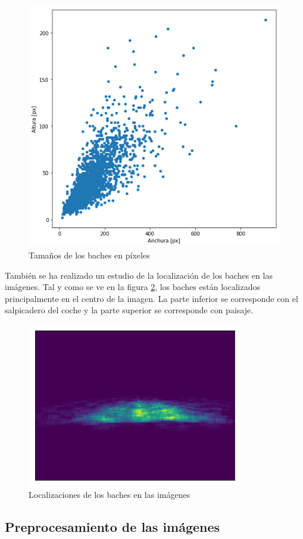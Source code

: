 \begin{figure}[H]
	\centering
	\includegraphics[width=0.7\linewidth]{images/pothole_sizes_scatter_plot.png}
	\caption{Tamaños de los baches en píxeles}
	\label{fig:potholesizes}
\end{figure}

También se ha realizado un estudio de la localización de los baches en las imágenes. Tal y como se ve en la figura \ref{fig:potholeslocations}, los baches están localizados principalmente en el centro de la imagen. La parte inferior se corresponde con el salpicadero del coche y la parte superior se corresponde con paisaje.

\begin{figure}[H]
	\centering
	\includegraphics[width=0.7\linewidth]{images/pothole_locations_heatmap.png}
	\caption{Localizaciones de los baches en las imágenes}
	\label{fig:potholeslocations}
\end{figure}

\subsection{Preprocesamiento de las imágenes}
\label{subsec:preprocesamiento_de_las_imagenes}

